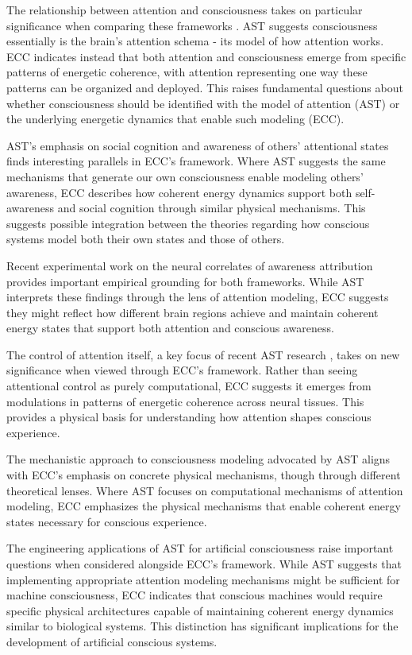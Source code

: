 \begin{refsection}
The relationship between attention and consciousness takes on particular significance when comparing these frameworks \cite{GrazianoWebb2015}. AST suggests consciousness essentially is the brain's attention schema - its model of how attention works. ECC indicates instead that both attention and consciousness emerge from specific patterns of energetic coherence, with attention representing one way these patterns can be organized and deployed. This raises fundamental questions about whether consciousness should be identified with the model of attention (AST) or the underlying energetic dynamics that enable such modeling (ECC).

AST's emphasis on social cognition and awareness of others' attentional states \cite{Kelly2014} finds interesting parallels in ECC's framework. Where AST suggests the same mechanisms that generate our own consciousness enable modeling others' awareness, ECC describes how coherent energy dynamics support both self-awareness and social cognition through similar physical mechanisms. This suggests possible integration between the theories regarding how conscious systems model both their own states and those of others.

Recent experimental work on the neural correlates of awareness attribution \cite{Webb2016} provides important empirical grounding for both frameworks. While AST interprets these findings through the lens of attention modeling, ECC suggests they might reflect how different brain regions achieve and maintain coherent energy states that support both attention and conscious awareness.

The control of attention itself, a key focus of recent AST research \cite{WebbKemper2020}, takes on new significance when viewed through ECC's framework. Rather than seeing attentional control as purely computational, ECC suggests it emerges from modulations in patterns of energetic coherence across neural tissues. This provides a physical basis for understanding how attention shapes conscious experience.

The mechanistic approach to consciousness modeling advocated by AST \cite{Kelly2016} aligns with ECC's emphasis on concrete physical mechanisms, though through different theoretical lenses. Where AST focuses on computational mechanisms of attention modeling, ECC emphasizes the physical mechanisms that enable coherent energy states necessary for conscious experience.

The engineering applications of AST for artificial consciousness \cite{Graziano2017} raise important questions when considered alongside ECC's framework. While AST suggests that implementing appropriate attention modeling mechanisms might be sufficient for machine consciousness, ECC indicates that conscious machines would require specific physical architectures capable of maintaining coherent energy dynamics similar to biological systems. This distinction has significant implications for the development of artificial conscious systems.


\end{refsection}
